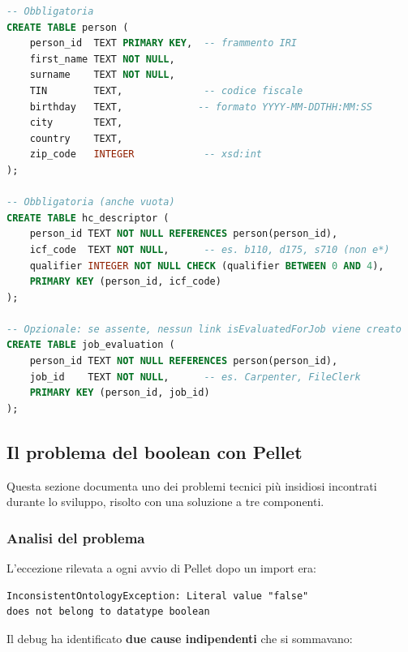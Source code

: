 \documentclass[a4paper,12pt]{article}
\begin{document}
\begin{lstlisting}[language=SQL, caption={Schema SQL del dataset di import.}]
-- Obbligatoria
CREATE TABLE person (
    person_id  TEXT PRIMARY KEY,  -- frammento IRI
    first_name TEXT NOT NULL,
    surname    TEXT NOT NULL,
    TIN        TEXT,              -- codice fiscale
    birthday   TEXT,             -- formato YYYY-MM-DDTHH:MM:SS
    city       TEXT,
    country    TEXT,
    zip_code   INTEGER            -- xsd:int
);

-- Obbligatoria (anche vuota)
CREATE TABLE hc_descriptor (
    person_id TEXT NOT NULL REFERENCES person(person_id),
    icf_code  TEXT NOT NULL,      -- es. b110, d175, s710 (non e*)
    qualifier INTEGER NOT NULL CHECK (qualifier BETWEEN 0 AND 4),
    PRIMARY KEY (person_id, icf_code)
);

-- Opzionale: se assente, nessun link isEvaluatedForJob viene creato
CREATE TABLE job_evaluation (
    person_id TEXT NOT NULL REFERENCES person(person_id),
    job_id    TEXT NOT NULL,      -- es. Carpenter, FileClerk
    PRIMARY KEY (person_id, job_id)
);
\end{lstlisting}

\noindent \subsection{Il problema del boolean con Pellet}
\label{sec:boolean}

Questa sezione documenta uno dei problemi tecnici pi\`{u} insidiosi
incontrati durante lo sviluppo, risolto con una soluzione a tre componenti.

\subsubsection{Analisi del problema}

L'eccezione rilevata a ogni avvio di Pellet dopo un import era:
\begin{lstlisting}[numbers=none, language={}]
InconsistentOntologyException: Literal value "false"
does not belong to datatype boolean
\end{lstlisting}

\noindent Il debug ha identificato \textbf{due cause indipendenti} che si sommavano:
\end{document}
